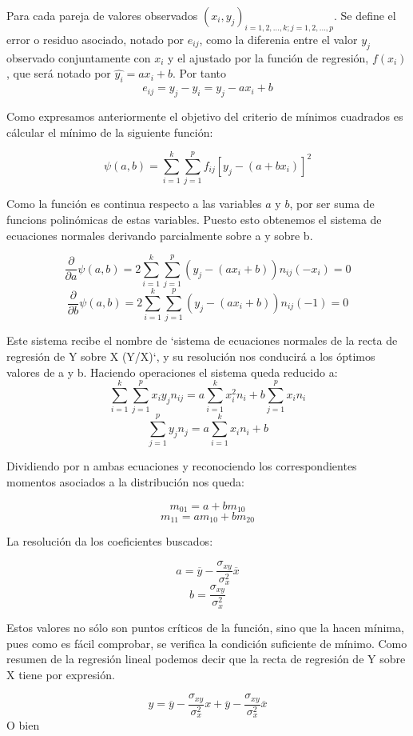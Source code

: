 \documentclass{article}
\theoremstyle{definition}
\begin{document}
	Para cada pareja de valores observados ${(x_i,y_j)}_{i=1,2, \ldots, k; j=1,2,\ldots,p}$. Se
	define el error o residuo asociado, notado por $e_{ij}$, como la diferenia
	entre el valor $y_j$ observado conjuntamente con $x_i$ y el ajustado por la
	función de regresión, $f(x_i)$, que será notado por $\hat{y_i} = ax_i +b$. Por
	tanto $$e_{ij} = y_j - \hat{y_i} = y_j - ax_i + b $$

	Como expresamos anteriormente el objetivo del criterio de mínimos cuadrados es
	cálcular el mínimo de la siguiente función:

	$$
	\psi (a,b) =
			\sum_{i=1}^k \sum_{j=1}^p f_{ij} {[y_j - (a+bx_i)]}^2
	$$

	Como la función es continua respecto a las variables $a$ y $b$, por ser suma
	de funcions polinómicas de estas variables. Puesto esto obtenemos el sistema
	de ecuaciones normales derivando parcialmente sobre a y sobre b.

	$$ \frac{\partial}{\partial a} \psi(a,b) = 2 \sum_{i=1}^k \sum_{j=1}^p ( y_j -
	(ax_i +b )) n_{ij} (-x_i) = 0 $$ $$ \frac{\partial}{\partial b} \psi(a,b) = 2
	\sum_{i=1}^k \sum_{j=1}^p ( y_j - (ax_i +b )) n_{ij} (-1) = 0 $$

	Este sistema recibe el nombre de `sistema de ecuaciones normales de la recta
	de regresión de Y sobre X (Y/X)`, y su resolución nos conducirá a los óptimos
	valores de a y b. Haciendo operaciones el sistema queda reducido a: $$
	\sum_{i=1}^k \sum_{j=1}^p x_i y_j n_{ij}  = a \sum_{i=1}^k x_i^2 n_i +
	b\sum_{j= 1}^p x_i n_i $$ $$ \sum_{j=1}^p y_j n_j = a \sum_{i=1}^k x_i n_i + b $$

	Dividiendo por n ambas ecuaciones y reconociendo los correspondientes momentos
	asociados a la distribución nos queda:

	$$ m_{01} = a + bm_{10}$$ $$ m_{11} = am_{10} + bm_{20} $$

	La resolución da los coeficientes buscados:

	$$ a = \overline{y} - \frac{\sigma_{xy}}{\sigma_x^2} \overline{x} $$	  $$  b =
	\frac{\sigma_{xy}}{\sigma_x^2} $$

	 Estos valores no sólo son puntos críticos de la función, sino que la hacen
	 mínima, pues como es fácil comprobar, se verifica la condición suficiente de
	 mínimo. Como resumen de la regresión lineal podemos decir que la recta de
	 regresión de Y sobre X tiene por expresión.

	$$ y = \overline{y} - \frac{\sigma_{xy}}{\sigma_x^2} x + \overline{y} -
	\frac{\sigma_{xy}}{\sigma_x^2} \overline{x}$$ O bien
\end{document}
